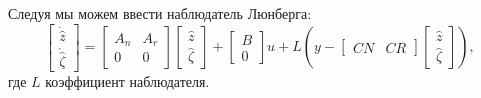 Следуя \cite{SAVIN2021} мы можем ввести наблюдатель Люнберга:
%
\begin{equation}
	\begin{bmatrix}
		\dot{\hat{z}} \\
		\dot{\hat{\zeta}}
	\end{bmatrix}=\begin{bmatrix}
		{A}_n & {A}_r \\
		0 & 0
	\end{bmatrix}
	\begin{bmatrix}
		\hat{z}\\ \hat{\zeta}
	\end{bmatrix}
	+  \begin{bmatrix}
		{B}\\0
	\end{bmatrix}u + {L} \left( y-\begin{bmatrix}
		{C}{N} & {C}{R}
	\end{bmatrix} \begin{bmatrix}
		\hat{z}\\ \hat{\zeta}
	\end{bmatrix} \right),
\end{equation}
%
где ${L}$ коэффициент наблюдателя.


